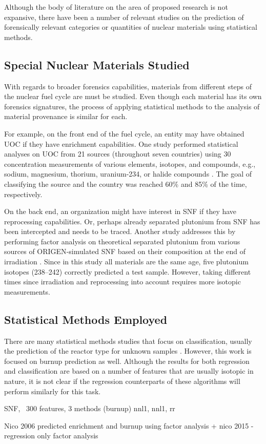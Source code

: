 Although the body of literature on the area of proposed research is not
expansive, there have been a number of relevant studies on the prediction of
forensically relevant categories or quantities of nuclear materials using
statistical methods. 

\subsection{Special Nuclear Materials Studied}

With regards to broader forensics capabilities, materials from different steps
of the nuclear fuel cycle are must be studied.  Even though each material has
its own forensics signatures, the process of applying statistical methods to
the analysis of material provenance is similar for each. 

For example, on the front end of the fuel cycle, an entity may have obtained
\gls{UOC} if they have enrichment capabilities.  One study performed
statistical analyses on \gls{UOC} from 21 sources (throughout seven countries)
using 30 concentration measurements of various elements, isotopes, and
compounds, e.g., sodium, magnesium, thorium, uranium-234, or halide compounds
\cite{robel_2009}.  The goal of classifying the source and the country was
reached 60\% and 85\% of the time, respectively. 

On the back end, an organization might have interest in \gls{SNF} if they have
reprocessing capabilities.  Or, perhaps already separated plutonium from
\gls{SNF} has been intercepted and needs to be traced. Another study addresses
this by performing factor analysis on theoretical separated plutonium from
various sources of \gls{ORIGEN}-simulated \gls{SNF} based on their composition
at the end of irradiation \cite{nicolaou_pu}.  Since in this study all
materials are the same age, five plutonium isotopes (238--242) correctly
predicted a test sample. However, taking different times since irradiation and
reprocessing into account requires more isotopic measurements. 

\subsection{Statistical Methods Employed}

There are many statistical methods studies that focus on classification,
usually the prediction of the reactor type for unknown samples
\cite{robel_2009, nicolaou_pu, jones_snf_2014, nicolaou_2009}.  However, this
work is focused on burnup prediction as well.  Although the results for both
regression and classification are based on a number of features that are
usually isotopic in nature, it is not clear if the regression counterparts of
these algorithms will perform similarly for this task. 



SNF, ~300 features, 3 methods \cite{dayman_feasibility_2013} (burnup)
nnl1, nnl1, rr

Nico 2006 predicted enrichment and burnup using factor analysis + nico 2015 - regression only
factor analysis

